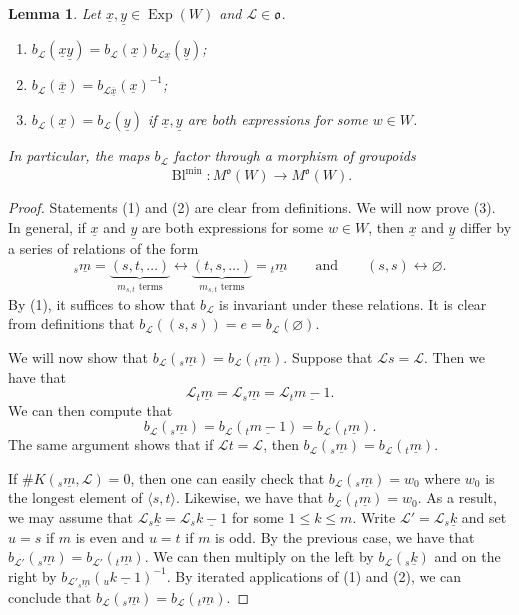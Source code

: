 \documentclass{amsart}
\newcommand{\scrL}{\mathcal{L}}
\newcommand{\fr}[1]{\mathfrak{#1}}
\DeclareMathOperator{\Exp}{Exp}
\newcommand{\ux}{\underline{x}}
\newcommand{\uy}{\underline{y}}
\DeclareMathOperator{\Bl}{Bl}
\renewcommand{\emptyset}{\varnothing}
\newtheorem{lemma}[subsubsection]{Lemma}
\theoremstyle{definition}
\numberwithin{equation}{subsection}
\begin{document}
\begin{lemma}\label{lem:block_prelims}
    Let $\ux, \uy \in \Exp (W)$ and $\scrL \in \fr{o}$.
    \begin{enumerate}
        \item $b_{\scrL} (\ux \uy) = b_{\scrL} (\ux) b_{\scrL \ux} (\uy)$;
        \item $b_{\scrL} (\overline{\ux}) = b_{\scrL \overline{\ux}} (\ux)^{-1}$;
        \item $b_{\scrL} (\ux) = b_{\scrL} (\uy)$ if $\ux, \uy$ are both expressions for some $w \in W$.
    \end{enumerate}
    In particular, the maps $b_{\scrL}$ factor through a morphism of groupoids
    \[\Bl^{\min} : M^{\fr{o}} (W) \to M^{\fr{o}} (W).\]
\end{lemma}
\begin{proof}
    Statements (1) and (2) are clear from definitions.
    We will now prove (3).
    In general, if $\ux$ and $\uy$ are both expressions for some $w \in W$, then $\ux$ and $\uy$ differ by a series of relations of the form
    \[{}_s \underline{m} = \underbrace{(s,t,\ldots)}_{m_{s,t} \text{ terms}} \leftrightarrow \underbrace{(t,s,\ldots)}_{m_{s,t} \text{ terms}} = {}_t \underline{m} \qquad \text{and} \qquad (s,s) \leftrightarrow \emptyset.\]
    By (1), it suffices to show that $b_{\scrL}$ is invariant under these relations. It is clear from definitions that $b_{\scrL} ( (s,s)) = e = b_{\scrL} (\emptyset)$.
    
    We will now show that $b_{\scrL} ({}_s \underline{m}) = b_{\scrL} ({}_t \underline{m})$.
    Suppose that $\scrL s = \scrL$. 
    Then we have that 
    \[\scrL {}_t \underline{m} = \scrL {}_s \underline{m} = \scrL {}_t \underline{m-1}.\]
    We can then compute that
    \[b_{\scrL} ({}_s \underline{m}) = b_{\scrL} ({}_t \underline{m-1}) = b_{\scrL} ({}_t \underline{m}).\]
    The same argument shows that if $\scrL t = \scrL$, then $b_{\scrL} ({}_s \underline{m}) = b_{\scrL} ({}_t \underline{m})$.

    If $\# K ({}_s \underline{m}, \scrL) = 0$, then one can easily check that $b_{\scrL} ({}_s \underline{m}) = w_0$ where $w_0$ is the longest element of $\langle s,t \rangle$.
    Likewise, we have that $b_{\scrL} ({}_t \underline{m}) = w_0$.
    As a result, we may assume that $\scrL {}_s \underline{k} = \scrL {}_s \underline{k-1}$ for some $1 \leq k \leq m$. 
    Write $\scrL' = \scrL {}_s \underline{k}$ and set $u = s$ if $m$ is even and $u = t$ if $m$ is odd.
    By the previous case, we have that $b_{\scrL'} ({}_s \underline{m}) = b_{\scrL'} ({}_t \underline{m})$.
    We can then multiply on the left by $b_{\scrL} ({}_s \underline{k})$ and on the right by $b_{\scrL' {}_s \underline{m}} ({}_u \underline{k-1})^{-1}$.
    By iterated applications of (1) and (2), we can conclude that $b_{\scrL} ({}_s \underline{m}) = b_{\scrL} ({}_t \underline{m})$.
\end{proof}
\end{document}
